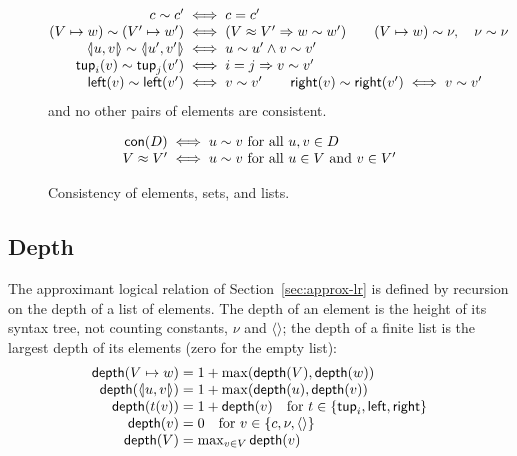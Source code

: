\begin{figure}[h]
\small\figdefs
{}
\[
\begin{array}{@{}r@{\;}c@{\;}l@{}}
  c \sim c' & \iff & c = c'\\
  (V \mapsto w) \sim (V' \mapsto w') & \iff &
    (V \approx V' \Rightarrow w \sim w')
    \qquad
    (V \mapsto w) \sim \nu, \quad \nu \sim \nu\\
  \pairv{u}{v} \sim \pairv{u'}{v'} & \iff & u \sim u' \land v \sim v'\\
  \mathsf{tup}_i(v) \sim \mathsf{tup}_j(v') & \iff & i = j \Rightarrow v \sim v'\\
  \mathsf{left}(v) \sim \mathsf{left}(v') & \iff & v \sim v'
    \qquad
  \mathsf{right}(v) \sim \mathsf{right}(v') \iff v \sim v'
\end{array}
\]
\noindent and no other pairs of elements are consistent.

\[
\begin{array}{@{}r@{\;}c@{\;}l@{}}
  \mathsf{con}(D) & \iff & u \sim v \text{ for all } u, v \in D\\
  V \approx V' & \iff & u \sim v \text{ for all } u \in V \text{ and } v \in V'
\end{array}
\]
\caption{Consistency of elements, sets, and lists.}
\label{fig:consistency}
\end{figure}

\subsection{Depth}
\label{app:depth}

The approximant logical relation of Section~\ref{sec:approx-lr} is defined by recursion on the depth of a list of elements. The depth of an element is the height of its syntax tree, not counting constants, $\nu$ and $\langle\rangle$; the depth of a finite list is the largest depth of its
elements (zero for the empty list):
\[
\begin{array}{@{}r@{\;}c@{\;}l@{}}
  \depth(V \mapsto w) & = & 1 + \max(\depth(V), \depth(w))\\
  \depth(\pairv{u}{v}) & = & 1 + \max(\depth(u), \depth(v))\\
  \depth(t(v)) & = & 1 + \depth(v)
    \quad \text{for } t \in \{\mathsf{tup}_i, \mathsf{left}, \mathsf{right}\}\\
  \depth(v) & = & 0
    \quad \text{for } v \in \{c, \nu, \langle\rangle\}\\
  \depth(V) & = & \max_{v \in V} \depth(v)
\end{array}
\]

